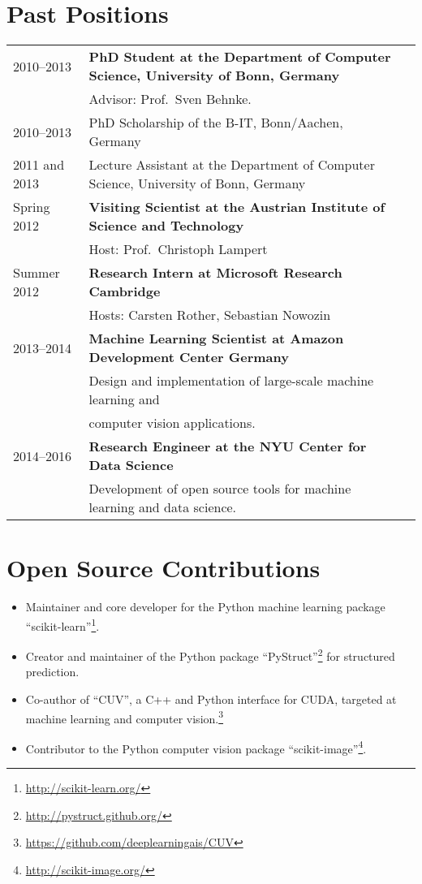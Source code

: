 \documentclass[a4paper,11pt]{article}
\begin{document}
\section{Past Positions}
\begin{tabular}{lll}
    2010--2013 & \textbf{PhD Student at the Department of Computer Science, University of Bonn, Germany}\\
         & Advisor: Prof.\ Sven Behnke. \\
    2010--2013 & PhD Scholarship of the B-IT, Bonn/Aachen, Germany\\
    2011 and 2013& Lecture Assistant at the Department of Computer Science, University of Bonn, Germany \\
    Spring 2012 & \textbf{Visiting Scientist at the Austrian Institute of Science and Technology}\\
               & Host: Prof.\ Christoph Lampert\\
    Summer 2012 & \textbf{Research Intern at Microsoft Research Cambridge}\\
               & Hosts: Carsten Rother, Sebastian Nowozin\\
    2013--2014 & \textbf{Machine Learning Scientist at Amazon Development Center Germany}\\
              & Design and implementation of large-scale machine learning and\\
              & computer vision applications.\\
    2014--2016 & \textbf{Research Engineer at the NYU Center for Data Science}\\
               & Development of open source tools for machine learning and data science.\\
\end{tabular}

\section{Open Source Contributions}
\begin{itemize}
    \item Maintainer and core developer for the Python machine learning package ``scikit-learn''\footnote{\url{http://scikit-learn.org/}}.
    \item Creator and maintainer of the Python package ``PyStruct''\footnote{\url{http://pystruct.github.org/}} for structured prediction.
    \item Co-author of ``CUV'', a C++ and Python interface for CUDA,
        targeted at machine learning and computer vision.\footnote{\url{https://github.com/deeplearningais/CUV}}
    \item Contributor to the Python computer vision package ``scikit-image''\footnote{\url{http://scikit-image.org/}}.
\end{itemize}
\pagebreak
\end{document}
